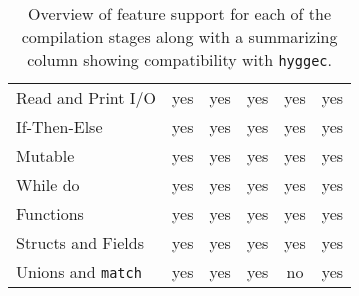 \begin{table}[H]
\begin{tabular}{lccccc}
Read and Print I/O           & yes                                & yes                              & yes                                & yes                                & yes                                                              \\
If-Then-Else                 & yes                                & yes                              & yes                                & yes                                & yes                                                              \\
Mutable                      & yes                                & yes                              & yes                                & yes                                & yes                                                              \\
While do                     & yes                                & yes                              & yes                                & yes                                & yes                                                              \\
Functions                    & yes                                & yes                              & yes                                & yes                                & yes                                                              \\  
Structs and Fields & yes                                & yes                              & yes                                & yes           & yes                                         \\ 
Unions and \texttt{match}  & yes                                & yes                              & yes                                & no                                 & yes                                                             
\end{tabular}
\caption{Overview of feature support for each of the compilation stages along with a summarizing column showing compatibility with \texttt{hyggec}.}
\label{table:requirements_fulfillment}
\end{table}

